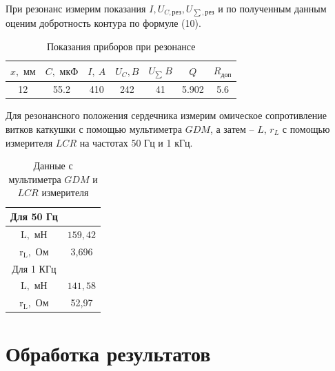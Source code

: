 \documentclass[a4paper, 12pt]{article}%
\begin{document}
При резонанс измерим показания $I, U_{C,\text{рез}}, U_{\sum,\text{рез}}$ и по полученным данным оценим добротность контура по формуле (10).

\begin{table}[!h]
\begin{center}
\begin{tabular}{|c|c|c|c|c|c|c|}
\hline 
$x,\text{ мм}$ & $C,\text{ мкФ}$ & $I,\ A$ & $U_C, B$ & $U_{\sum}\ B$ & $Q$ & $R_{\text{доп}}$ \\ 
\hline 
12 & 55.2 & 410 & 242 & 41 & 5.902 & 5.6 \\ 
\hline 
\end{tabular}
\caption{Показания приборов при резонансе}
\end{center} 
\end{table}

Для резонансного положения сердечника измерим омическое сопротивление витков каткушки с помощью мультиметра $GDM$, а затем -- $L$, $r_L$ с помощью измерителя $LCR$ на частотах 50 Гц и 1 кГц.


\begin{table}[!h]
\begin{center}
\begin{tabular}{|c|c|}
\hline Для 50 Гц &\\
\hline $\mathrm{L}, $ мН& $159,42 $\\
\hline $\mathrm{r_L}, $ Ом& 3,696\\
\hline Для 1 КГц &\\
\hline $\mathrm{L}, $ мН& $141,58 $\\
\hline $\mathrm{r_L}, $ Ом& 52,97\\
\hline
\end{tabular}
\caption{Данные с мультиметра $GDM$ и $LCR$ измерителя}
\end{center} 
\end{table}


\section{Обработка результатов}
\end{document}
